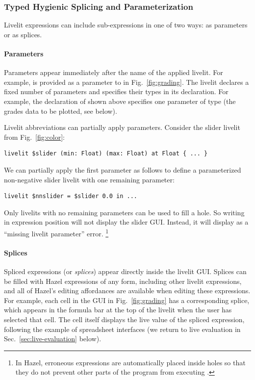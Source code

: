 \subsubsection{Typed Hygienic Splicing and Parameterization}\label{sec:splicing-and-parameterization}
Livelit expressions can include sub-expressions in one of two ways:
as parameters or as splices.

\paragraph{Parameters}\label{sec:parameterization} Parameters appear immediately after the name of the applied livelit.
For example,  is provided as a parameter to  in Fig.~\ref{fig:grading}.
The livelit declares a fixed number of parameters and specifies their types in its declaration.
For example, the declaration of  shown above specifies one parameter of type 
(the grades data to be plotted, see below).

Livelit abbreviations can partially apply parameters. Consider the slider livelit
from Fig.~\ref{fig:color}:
\begin{lstlisting}[numbers=none]
livelit $slider (min: Float) (max: Float) at Float { ... }
\end{lstlisting}
We can partially apply the first parameter as follows to define a parameterized non-negative slider livelit with one remaining parameter:
\begin{lstlisting}[numbers=none]
livelit $nnslider = $slider 0.0 in ...
\end{lstlisting}
Only livelits with no remaining parameters can be used to fill a hole.
So writing  in expression position will not display the slider GUI. Instead, it will display as a ``missing livelit parameter'' error.%
\footnote{\label{footnote:typing}In Hazel, erroneous expressions are automatically placed inside holes so that they do not prevent other parts of the program from executing
\cite{HazelnutLive}.}

\paragraph{Splices}\label{sec:splices}
Spliced expressions (or \emph{splices}) appear directly inside the livelit GUI.
Splices can be filled with Hazel expressions of any form, including other livelit expressions,
and all of Hazel's editing affordances are available when editing these expressions.
For example, each cell in the  GUI in Fig.~\ref{fig:grading}
has a corresponding splice, which appears in the formula bar at the top of the livelit
when the user has selected that cell.
The cell itself displays the live value of the spliced expression,
following the example of spreadsheet interfaces
(we return to live evaluation in Sec.~\ref{sec:live-evaluation} below).

